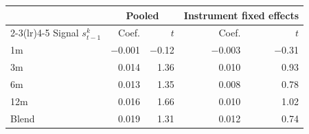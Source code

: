 \begin{tabular}{lrrrr}
\toprule
& \multicolumn{2}{c}{Pooled} & \multicolumn{2}{c}{Instrument fixed effects} \\
\cmidrule(lr){2-3}\cmidrule(lr){4-5}
Signal $s^k_{t-1}$ & Coef. & $t$ & Coef. & $t$ \\
\midrule
1m & $-$0.001 & $-$0.12 & $-$0.003 & $-$0.31 \\
3m & 0.014 & 1.36 & 0.010 & 0.93 \\
6m & 0.013 & 1.35 & 0.008 & 0.78 \\
12m & 0.016 & 1.66 & 0.010 & 1.02 \\
Blend & 0.019 & 1.31 & 0.012 & 0.74 \\
\bottomrule
\end{tabular}
